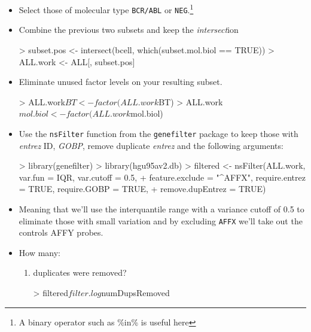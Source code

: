 \documentclass[letterpaper,12pt]{article}
\newcommand{\pl}[1]{\texttt{#1}}
\begin{document}
\begin{itemize}
  \item Select those of molecular type \pl{BCR/ABL} or \pl{NEG}.\footnote{A binary operator such as \%in\% is useful here}
\begin{Schunk}
\end{Schunk}
  \item Combine the previous two subsets and keep the \emph{intersect}ion
\begin{Schunk}
\begin{Sinput}
> subset.pos <- intersect(bcell, which(subset.mol.biol == TRUE))
> ALL.work <- ALL[, subset.pos]
\end{Sinput}
\end{Schunk}
  \item Eliminate unused factor levels on your resulting subset.
\begin{Schunk}
\begin{Sinput}
> ALL.work$BT <- factor(ALL.work$BT)
> ALL.work$mol.biol <- factor(ALL.work$mol.biol)
\end{Sinput}
\end{Schunk}
  \item Use the \pl{nsFilter} function from the \pl{genefilter} package to keep those with \emph{entrez} ID, \emph{GOBP}, remove duplicate \emph{entrez} and the following arguments:
\begin{Schunk}
\begin{Sinput}
> library(genefilter)
> library(hgu95av2.db)
> filtered <- nsFilter(ALL.work, var.fun = IQR, var.cutoff = 0.5, 
+     feature.exclude = "^AFFX", require.entrez = TRUE, require.GOBP = TRUE, 
+     remove.dupEntrez = TRUE)
\end{Sinput}
\end{Schunk}
  \item Meaning that we'll use the interquantile range with a variance cutoff of 0.5 to eliminate those with small variation and by excluding \pl{AFFX} we'll take out the controls AFFY probes.
  \item How many:
  \begin{enumerate}
  \item duplicates were removed?
\begin{Schunk}
\begin{Sinput}
> filtered$filter.log$numDupsRemoved
\end{Sinput}
\begin{Soutput}

\end{Soutput}
\end{Schunk}
\end{enumerate}
\end{itemize}
\end{document}
